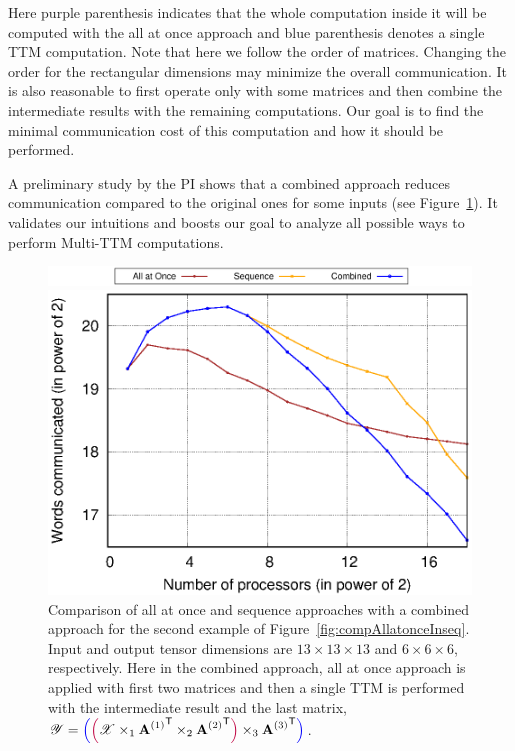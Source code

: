 \documentclass[a4paper,11pt]{article}
\newcommand{\X}{\T{X}}
\newcommand{\Y}{\T{Y}}
\newcommand{\allatoncecolor}{\color{purple}}
\newcommand{\seqcolor}{\color{blue}}
\newcommand{\allatoncestart}{{\allatoncecolor\Big(}}
\newcommand{\allatonceend}{{\allatoncecolor\Big)}}
\newcommand{\seqstart}{{\seqcolor\Big(}}
\newcommand{\seqend}{{\seqcolor\Big)}}
\newcommand{\sk}[1]{{\color{blue} \emph{#1}}}
\begin{document}
	
	Here purple parenthesis indicates that the whole computation inside it will be computed with the all at once approach and blue parenthesis denotes a single TTM computation.  Note that here we follow the order of matrices. Changing the order for the rectangular dimensions may minimize the overall communication. It is also reasonable to first operate only with some matrices and then combine the intermediate results with the remaining computations. Our goal is to find the minimal communication cost of this computation and how it should be performed. 
	

	A preliminary study by the PI shows that a combined approach reduces communication compared to the original ones for some inputs (see Figure~\ref{fig:compCombinedAllatonceseq}). It validates our intuitions and boosts our goal to analyze all possible ways to perform  Multi-TTM computations.




\begin{figure}[htb]
	\begin{center}
		\includegraphics[scale=0.12]{./plots/all-at-once-seq-combined-label.png}
	\end{center}
	\vspace*{-1cm}\begin{center}
		\includegraphics[width=0.45\linewidth]{./plots/AAO-vs-Seq-logscale-comparison-with-coup.eps}
		\caption{Comparison of all at once and sequence approaches with a combined approach for the second example of Figure~\ref{fig:compAllatonceInseq}. Input and output tensor dimensions are $13\times13\times13$ and $6\times6\times6$, respectively. Here in the combined approach,  all at once approach is applied with first two matrices and then a single TTM is performed with the intermediate  result and the last matrix, $\Y = \seqstart\allatoncestart\X \times_1 {\Mn{A}{1}}^\Tra \times_2 {\Mn{A}{2}}^\Tra\allatonceend \times_3 {\Mn{A}{3}}^\Tra\seqend$. \label{fig:compCombinedAllatonceseq}}
	\end{center}		
\end{figure}
	
\end{document}

